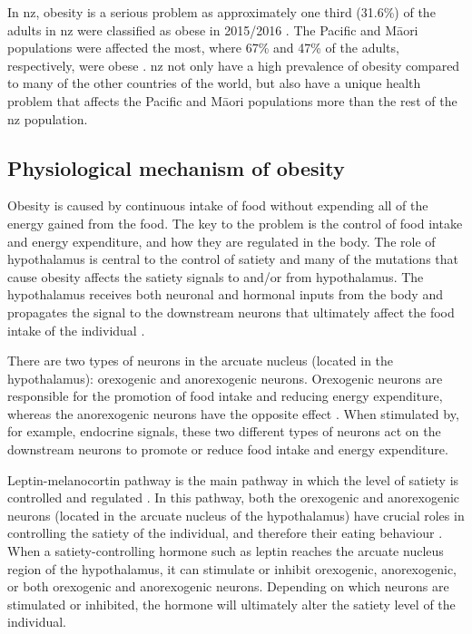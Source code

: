 In \gls{nz}, obesity is a serious problem as approximately one third (31.6\%) of the adults in \gls{nz} were classified as obese in 2015/2016 \citep{Health2016}.
The Pacific and M\=aori populations were affected the most, where 67\% and 47\% of the adults, respectively, were obese \citep{Health2016}.
\gls{nz} not only have a high prevalence of obesity compared to many of the other countries of the world, but also have a unique health problem that affects the Pacific and M\=aori populations more than the rest of the \gls{nz} population.

\subsection{Physiological mechanism of obesity}
\label{sub:physiological_mechanism_of_obesity}

Obesity is caused by continuous intake of food without expending all of the energy gained from the food.
The key to the problem is the control of food intake and energy expenditure, and how they are regulated in the body.
The role of hypothalamus is central to the control of satiety and many of the mutations that cause obesity affects the satiety signals to and/or from hypothalamus.
The hypothalamus receives both neuronal and hormonal inputs from the body and propagates the signal to the downstream neurons that ultimately affect the food intake of the individual \citep{Bell2005, Spiegelman2001}.

There are two types of neurons in the arcuate nucleus (located in the hypothalamus): orexogenic and anorexogenic neurons.
Orexogenic neurons are responsible for the promotion of food intake and reducing energy expenditure, whereas the anorexogenic neurons have the opposite effect \citep{Barsh2002}.
When stimulated by, for example, endocrine signals, these two different types of neurons act on the downstream neurons to promote or reduce food intake and energy expenditure.

Leptin-melanocortin pathway is the main pathway in which the level of satiety is controlled and regulated \citep{Spiegelman2001}.
In this pathway, both the orexogenic and anorexogenic neurons (located in the arcuate nucleus of the hypothalamus) have crucial roles in controlling the satiety of the individual, and therefore their eating behaviour \citep{Barsh2002,Bell2005}.
When a satiety-controlling hormone such as leptin reaches the arcuate nucleus region of the hypothalamus, it can stimulate or inhibit orexogenic, anorexogenic, or both orexogenic and anorexogenic neurons.
Depending on which neurons are stimulated or inhibited, the hormone will ultimately alter the satiety level of the individual.

